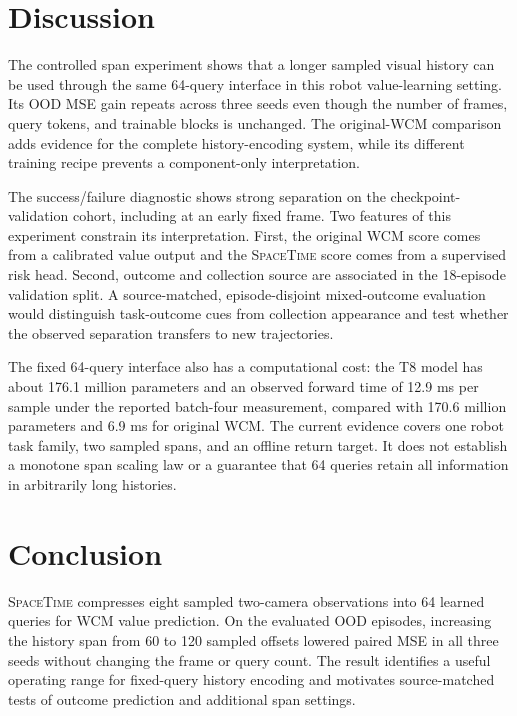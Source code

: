 \documentclass[10pt,a4paper]{article}
\newcommand{\SpaceTime}{\textsc{SpaceTime}}
\begin{document}
\clearpage

\section{Discussion}

The controlled span experiment shows that a longer sampled visual history can be used through the same 64-query interface in this robot value-learning setting. Its OOD MSE gain repeats across three seeds even though the number of frames, query tokens, and trainable blocks is unchanged. The original-WCM comparison adds evidence for the complete history-encoding system, while its different training recipe prevents a component-only interpretation.

The success/failure diagnostic shows strong separation on the checkpoint-validation cohort, including at an early fixed frame. Two features of this experiment constrain its interpretation. First, the original WCM score comes from a calibrated value output and the \SpaceTime{} score comes from a supervised risk head. Second, outcome and collection source are associated in the 18-episode validation split. A source-matched, episode-disjoint mixed-outcome evaluation would distinguish task-outcome cues from collection appearance and test whether the observed separation transfers to new trajectories.

The fixed 64-query interface also has a computational cost: the T8 model has about 176.1 million parameters and an observed forward time of 12.9 ms per sample under the reported batch-four measurement, compared with 170.6 million parameters and 6.9 ms for original WCM. The current evidence covers one robot task family, two sampled spans, and an offline return target. It does not establish a monotone span scaling law or a guarantee that 64 queries retain all information in arbitrarily long histories.

\section{Conclusion}

\SpaceTime{} compresses eight sampled two-camera observations into 64 learned queries for WCM value prediction. On the evaluated OOD episodes, increasing the history span from 60 to 120 sampled offsets lowered paired MSE in all three seeds without changing the frame or query count. The result identifies a useful operating range for fixed-query history encoding and motivates source-matched tests of outcome prediction and additional span settings.
\end{document}
